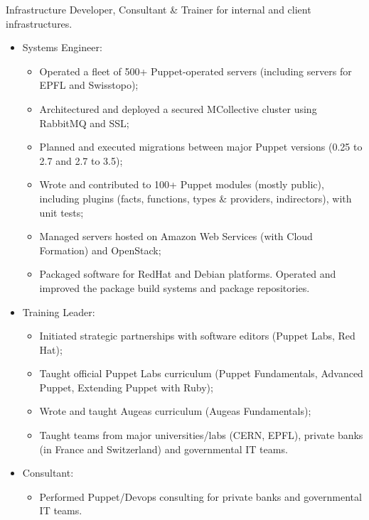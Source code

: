 \documentclass[11pt,a4paper,nolmodern]{moderncv}
\begin{document}
%
  {Infrastructure Developer, Consultant \& Trainer for internal and client infrastructures.
\begin{itemize}
  \item Systems Engineer:
    \begin{itemize}
      \item Operated a fleet of 500+ Puppet-operated servers (including servers for EPFL and Swisstopo);
      \item Architectured and deployed a secured MCollective cluster using RabbitMQ and SSL;
      \item Planned and executed migrations between major Puppet versions (0.25 to 2.7 and 2.7 to 3.5);
      \item Wrote and contributed to 100+ Puppet modules (mostly public), including plugins (facts, functions, types \& providers, indirectors), with unit tests;
      \item Managed servers hosted on Amazon Web Services (with Cloud Formation) and OpenStack;
      \item Packaged software for RedHat and Debian platforms. Operated and improved the package build systems and package repositories.
    \end{itemize}
  \item Training Leader:
    \begin{itemize}
      \item Initiated strategic partnerships ­with software editors (Puppet Labs, Red Hat);
      \item Taught official Puppet Labs curriculum (Puppet Fundamentals, Advanced Puppet, Extending Puppet with Ruby);
      \item Wrote and taught Augeas curriculum (Augeas Fundamentals);
      \item Taught teams from major universities/labs (CERN, EPFL), private banks (in France and Switzerland) and governmental IT teams.
    \end{itemize}
  \item Consultant:
    \begin{itemize}
      \item Performed Puppet/Devops consulting for private banks and governmental IT teams.
    \end{itemize}
\end{itemize}}
\end{document}
